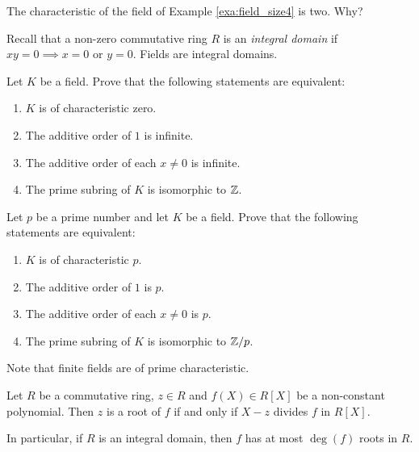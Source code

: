 \begin{example}
  The characteristic of the field of Example \ref{exa:field_size4}
  is two. Why?
\end{example}

Recall that a non-zero commutative ring $R$ is an \emph{integral 
domain} if $xy=0\implies x=0$ or $y=0$. Fields
are integral domains. 

\begin{exercise}
\label{xca: char 0}
	Let $K$ be a field. Prove that
	the following statements are equivalent:
	\begin{enumerate}
		\item $K$ is of characteristic zero.
		\item The additive order of $1$ is infinite. 
		\item The additive order of each $x\ne0$ is infinite.
		\item The prime subring of $K$ is isomorphic to $\mathbb{Z}$.
	\end{enumerate}
\end{exercise}

\begin{exercise}
\label{xca: char p}
	Let $p$ be a prime number and let $K$ be a field. Prove that
	the following statements are equivalent:
	\begin{enumerate}
		\item $K$ is of characteristic $p$.
		\item The additive order of $1$ is $p$. 
		\item The additive order of each $x\ne0$ is $p$.
		\item The prime subring of $K$ is isomorphic to $\mathbb{Z}/p$.
	\end{enumerate}
\end{exercise}



Note that finite fields are of prime characteristic. 

\begin{lemma}
    Let $R$ be a commutative ring, $z\in R$ and $f(X)\in R[X]$ be a non-constant polynomial.
    Then $z$ is a root of $f$ if and only if $X-z$ divides $f$ in $R[X]$.

    In particular, if $R$ is an integral domain, then
	$f$ has at most 
    $\deg(f)$ roots in $R$.
\end{lemma}

